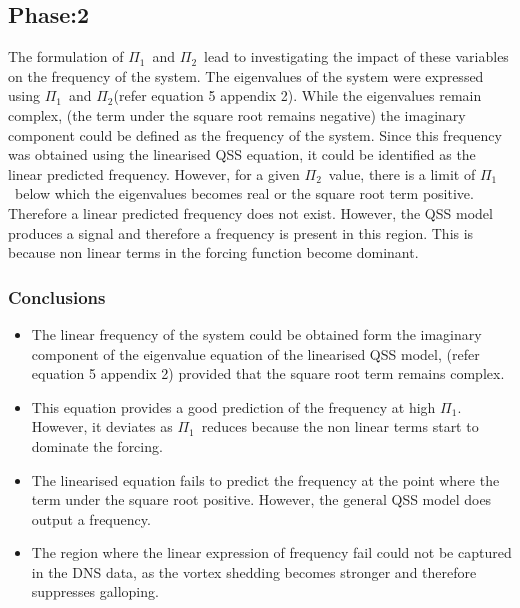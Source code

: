 \documentclass[authoryear,12pt]{article}
\newcommand{\massstiff}{\ensuremath{\Pi_1}}
\newcommand{\massdamp}{\ensuremath{\Pi_2}}
\begin{document}
\clearpage
\subsection{Phase:2}
 
 The formulation of \massstiff \ and \massdamp \ lead to investigating the impact of these variables on the frequency of the system. The eigenvalues of the system were expressed using \massstiff \ and \massdamp (refer equation 5 appendix 2). While the eigenvalues remain complex, (the term under the square root remains negative) the imaginary component could be defined as the frequency of the system. Since this frequency was obtained using the linearised QSS equation, it could be identified as the linear predicted frequency. However, for a given \massdamp \ value, there is a limit of \massstiff \ below which the eigenvalues becomes real or the square root term positive. Therefore a linear predicted frequency does not exist. However, the QSS model produces a signal and therefore a frequency is present in this region. This is because non linear terms in the forcing function become dominant.
 
 \subsubsection*{Conclusions}

\begin{itemize}

\item The linear frequency of the system could be obtained form the imaginary component of the eigenvalue equation of the linearised QSS model, (refer equation 5 appendix 2) provided that the square root term remains complex. 

\item This equation provides a good prediction of the frequency at high \massstiff. However, it deviates as \massstiff \ reduces because the non linear terms start to dominate the forcing. 

\item The linearised equation fails to predict the frequency at the point where the term under the square root positive. However, the general QSS model does output a frequency.  

\item The region where the linear expression of frequency fail could not be captured in the DNS data, as the vortex shedding becomes stronger and therefore suppresses galloping. 


\end{itemize}
\end{document}

